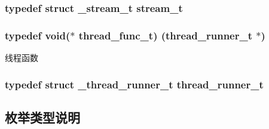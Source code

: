 \subsubsection[{stream\+\_\+t}]{\setlength{\rightskip}{0pt plus 5cm}typedef struct {\bf \+\_\+stream\+\_\+t} {\bf stream\+\_\+t}}\label{a00051_a261dba04f46f5c59a68a05f69f5a65a8_a261dba04f46f5c59a68a05f69f5a65a8}
\hypertarget{a00051_a46bcd8005e5d86fdbc6be5af0a77156c_a46bcd8005e5d86fdbc6be5af0a77156c}{}
\subsubsection[{thread\+\_\+func\+\_\+t}]{\setlength{\rightskip}{0pt plus 5cm}typedef void($\ast$ thread\+\_\+func\+\_\+t) ({\bf thread\+\_\+runner\+\_\+t} $\ast$)}\label{a00051_a46bcd8005e5d86fdbc6be5af0a77156c_a46bcd8005e5d86fdbc6be5af0a77156c}
线程函数 \hypertarget{a00051_a9054159cde2f926ef61c28ce1e555199_a9054159cde2f926ef61c28ce1e555199}{}
\subsubsection[{thread\+\_\+runner\+\_\+t}]{\setlength{\rightskip}{0pt plus 5cm}typedef struct {\bf \+\_\+thread\+\_\+runner\+\_\+t} {\bf thread\+\_\+runner\+\_\+t}}\label{a00051_a9054159cde2f926ef61c28ce1e555199_a9054159cde2f926ef61c28ce1e555199}


\subsection{枚举类型说明}
\hypertarget{a00051_a2217ac7363dbae279d056a361d122915_a2217ac7363dbae279d056a361d122915}{}

